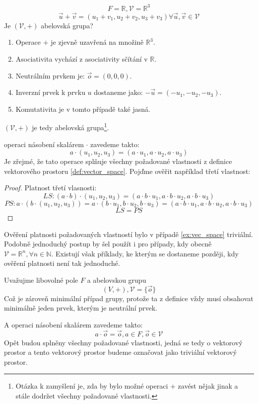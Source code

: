 \begin{example}
    $$F = \mathbb{R}, \mathcal{V} = \mathbb{R}^3$$
    $$\vec{u} + \vec{v} = (u_1 + v_1, u_2 + v_2, u_3 + v_3)
    \forall \vec{u}, \vec{v} \in \mathcal{V}$$
    Je $(\mathcal{V}, +)$ abelovská grupa?
    \begin{enumerate}[start=0]
        \item Operace $+$ je zjevně uzavřená na množině $\mathbb{R}^3$.
        \item Asociativita vychází z asociativity sčítání v $\mathbb{R}$.
        \item Neutrálním prvkem je: $\vec{o} = (0, 0, 0)$.
        \item Inverzní prvek k prvku $u$ dostaneme jako: $-\vec{u} = (-u_1, -u_2, -u_3)$.
        \item Komutativita je v tomto případě také jasná.
    \end{enumerate}
    $(\mathcal{V}, +)$ je tedy abelovská grupa\footnote{Otázka k zamyšlení je, zda by bylo
    možné operaci $+$ zavést nějak jinak a stále dodržet všechny požadované vlastnosti.}.

    operaci násobení skalárem $\cdot$ zavedeme takto:
    $$a \cdot (u_1, u_2, u_3) = (a \cdot u_1, a \cdot u_2, a \cdot u_3)$$
    Je zřejmé, že tato operace splňuje všechny požadované vlastnosti z definice
    vektorového prostoru \ref{def:vector_space}. Pojďme ověřit například třetí vlastnost:
    \begin{proof} Platnost třetí vlasnosti:
        $$LS: (a \cdot b) \cdot (u_1, u_2, u_3) =
        (a \cdot b \cdot u_1, a \cdot b \cdot u_2, a \cdot b \cdot u_3)$$
        $$PS: a\cdot (b \cdot (u_1, u_2, u_3)) = a \cdot (b \cdot u_1, b \cdot u_2, b \cdot u_3) =
        (a \cdot b \cdot u_1, a \cdot b \cdot u_2, a \cdot b \cdot u_3)$$
        $$LS = PS$$
    \end{proof}
    \label{ex:vec_space}
\end{example}

Ověření platnosti požadovaných vlastností bylo v případě \ref{ex:vec_space} triviální.
Podobně jednoduchý postup by šel použít i pro případy, kdy obecně
$\mathcal{V} = \mathbb{R}^n, \forall n \in \mathbb{N}$. Existují však příklady, ke kterým
se dostaneme později, kdy ověření platnosti není tak jednoduché.

\begin{definition}
    Uvažujme libovolné pole $F$ a abelovskou grupu
    $$(V, +), \mathcal{V} = \{\vec{o}\}$$
    Což je zároveň minimální případ grupy, protože ta z definice vždy musí
    obsahovat minimálně jeden prvek, kterým je neutrální prvek.

    A operaci násobení skalárem zavedeme takto:
    $$a \cdot \vec{o} = \vec{o}, a \in F, \vec{o} \in \mathcal{V}$$
    Opět budou splněny všechny požadované vlastnosti, jedná se tedy o vektorový prostor
    a tento vektorový prostor budeme označovat jako triviální vektorový prostor.
\end{definition}

